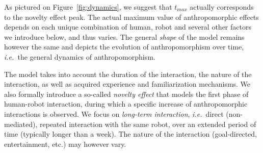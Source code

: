 \documentclass{frontiersSCNS} %
\newcommand{\ie}{{\textit{i.e.~}}}
\begin{document}
As pictured on Figure~\ref{fig:dynamics}, we suggest that $t_{max}$ actually
corresponds to the novelty effect peak. The actual maximum value of
anthropomorphic effects depends on each unique combination of human, robot and
several other factors we introduce below, and thus varies. The general
\emph{shape} of the model remains however the same and depicts the evolution of
anthropomorphism over time, \ie the general dynamics of anthropomorphism.

The model takes into account the duration of the interaction, the nature of the
interaction, as well as acquired experience and familiarization mechanisms. We
also formally introduce a so-called \emph{novelty effect} that models the first
phase of human-robot interaction, during which a specific increase of
anthropomorphic interactions is observed. We focus on \emph{long-term
interaction}, \ie direct (non-mediated), repeated interaction with the same
robot, over an extended period of time (typically longer than a week). The nature 
of the interaction (goal-directed, entertainment, etc.) may
however vary.
\end{document}
